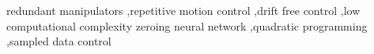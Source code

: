\documentclass[preprint,12pt]{elsarticle}
\begin{document}
\begin{frontmatter}
\begin{keyword}
redundant manipulators \sep repetitive motion control \sep drift free control \sep low computational complexity zeroing neural network \sep quadratic programming \sep sampled data control
\end{keyword}

\end{frontmatter}













\appendix

\end{document}
